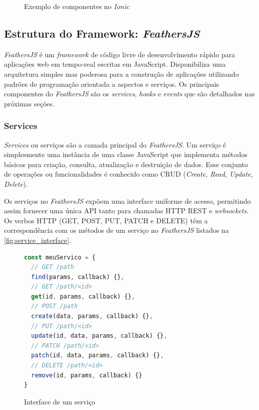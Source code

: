 \begin{figure}
{  }
  \caption{Exemplo de componentes no \textit{Ionic}}
  \label{fig:ionic_components}
\end{figure}

\subsection{Estrutura do Framework: \textit{FeathersJS}}

\textit{FeathersJS} é um \textit{framework} de código livre de desenvolvimento rápido para aplicações
web em tempo-real escritas em JavaScript. Disponibiliza uma arquitetura simples mas poderosa
para a construção de aplicações utilizando padrões de programação orientada a aspectos e serviços.
Os principais componentes do \textit{FeathersJS} são os \textit{services}, \textit{hooks} e
\textit{events} que são detalhados nas próximas seções.

\subsubsection{Services}

\textit{Services} ou serviços são a camada principal do \textit{\textit{FeathersJS}}.
Um serviço é simplesmente uma instância de uma classe JavaScript
que implementa métodos básicos para criação, consulta, atualização e
destruição de dados. Esse conjunto de operações ou funcionalidades é conhecido como
CRUD (\textit{Create, Read, Update, Delete}).

Os serviços no \textit{FeathersJS} expõem uma interface uniforme de acesso, permitindo
assim fornecer uma única API tanto para chamadas HTTP REST e \textit{websockets}.
Os verbos HTTP (GET, POST, PUT, PATCH e DELETE) têm a correspondência com
os métodos de um serviço no \textit{\textit{FeathersJS}} listados na \autoref{fig:service_interface}.

\begin{figure}[h]
\begin{lstlisting}[language=JavaScript]
const meuServico = {
  // GET /path
  find(params, callback) {},
  // GET /path/<id>
  get(id, params, callback) {},
  // POST /path
  create(data, params, callback) {},
  // PUT /path/<id>
  update(id, data, params, callback) {},
  // PATCH /path/<id>
  patch(id, data, params, callback) {},
  // DELETE /path/<id>
  remove(id, params, callback) {}
}
\end{lstlisting}
\caption{Interface de um serviço}
\label{fig:service_interface}
\end{figure}

